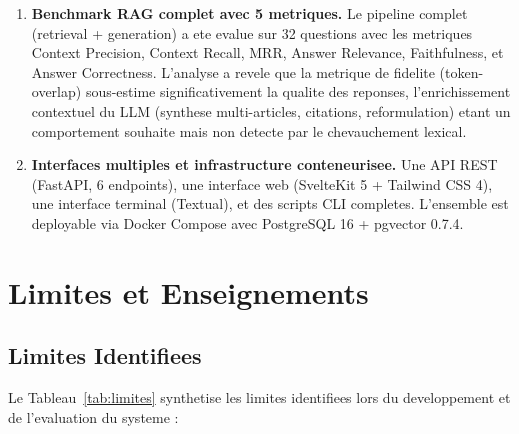 \begin{enumerate}
    \item \textbf{Benchmark RAG complet avec 5 metriques.} Le pipeline complet (retrieval + generation) a ete evalue sur 32 questions avec les metriques Context Precision, Context Recall, MRR, Answer Relevance, Faithfulness, et Answer Correctness. L'analyse a revele que la metrique de fidelite (token-overlap) sous-estime significativement la qualite des reponses, l'enrichissement contextuel du LLM (synthese multi-articles, citations, reformulation) etant un comportement souhaite mais non detecte par le chevauchement lexical.

    \item \textbf{Interfaces multiples et infrastructure conteneurisee.} Une API REST (FastAPI, 6 endpoints), une interface web (SvelteKit 5 + Tailwind CSS 4), une interface terminal (Textual), et des scripts CLI completes. L'ensemble est deployable via Docker Compose avec PostgreSQL 16 + pgvector 0.7.4.
\end{enumerate}

\section{Limites et Enseignements}

\subsection{Limites Identifiees}

Le Tableau~\ref{tab:limites} synthetise les limites identifiees lors du developpement et de l'evaluation du systeme :

